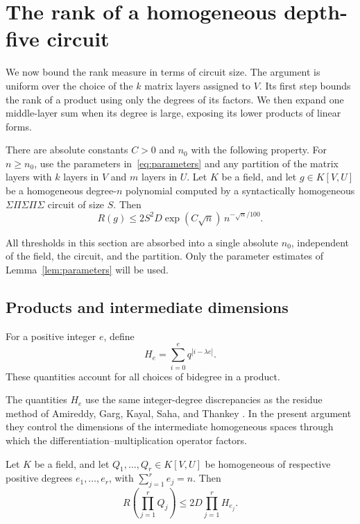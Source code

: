 \section{The rank of a homogeneous depth-five circuit}
\label{sec:circuits}

We now bound the rank measure in terms of circuit size.  The argument
is uniform over the choice of the $k$ matrix layers assigned to $V$.
Its first step bounds the rank of a product using only the degrees of
its factors.  We then expand one middle-layer sum when its degree is
large, exposing its lower products of linear forms.

\begin{proposition}
\label{prop:circuit}
There are absolute constants $C>0$ and $n_0$ with the following property.
For $n\ge n_0$, use the parameters in~\eqref{eq:parameters} and any
partition of the matrix layers with $k$ layers in $V$ and $m$ layers in
$U$.  Let $K$ be a field, and let $g\in K[V,U]$ be a homogeneous
degree-$n$ polynomial computed by a syntactically homogeneous
$\Sigma\Pi\Sigma\Pi\Sigma$ circuit of size $S$.  Then
\[
 R(g)\le 2S^2D\exp(C\sqrt n)\,n^{-\sqrt n/100}.
\]
\end{proposition}

All thresholds in this section are absorbed into a single absolute
$n_0$, independent of the field, the circuit, and the partition.
Only the parameter estimates of Lemma~\ref{lem:parameters} will be
used.

\subsection{Products and intermediate dimensions}

For a positive integer $e$, define
\[
 H_e=\sum_{i=0}^{e}q^{|i-\lambda e|}.
\]
These quantities account for all choices of bidegree in a product.

The quantities $H_e$ use the same integer-degree discrepancies as the
residue method of Amireddy, Garg, Kayal, Saha, and Thankey
\cite[Definition~2.1 and Lemma~3.1]{AmireddyGargKayalSahaThankey2022Full}.
In the present argument they control the dimensions of the intermediate
homogeneous spaces through which the differentiation--multiplication
operator factors.

\begin{lemma}
\label{lem:product-rank}
Let $K$ be a field, and let $Q_1,\ldots,Q_r\in K[V,U]$ be homogeneous of respective positive
degrees $e_1,\ldots,e_r$, with $\sum_{j=1}^r e_j=n$.  Then
\[
 R\left(\prod_{j=1}^r Q_j\right)
 \le 2D\prod_{j=1}^r H_{e_j}.
\]
\end{lemma}

